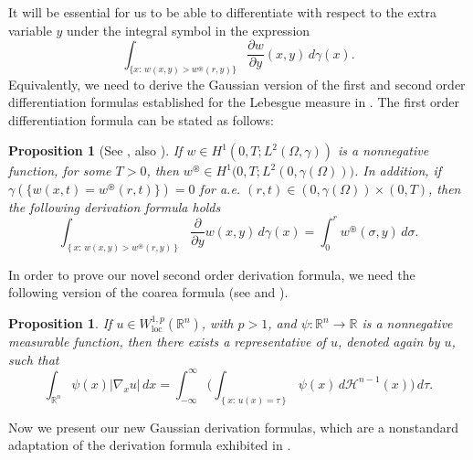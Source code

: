 \documentclass[a4paper,10pt,reqno]{amsart}
\newcommand{\R}{\mathbb{R}}
\newtheorem{proposition}[theorem]{Proposition}
\numberwithin{equation}{section}
\begin{document}
It will be essential for us to be able to differentiate
with respect to the extra variable $y$ under the integral symbol in the expression
\[\int_{\{x:\,w(x,y)>w^{\circledast}(r,y)\}}\frac{\partial w}{\partial y}(x,y)\,d\gamma(x).\]
Equivalently, we need to derive the Gaussian version of the first and second order differentiation
formulas established for the Lebesgue measure in \cite{Al-Li-TRo, Band2, Ferone-Mercaldo, Mossino}. The first order differentiation formula can be stated
as follows:

\begin{proposition}[See \cite{chiacchio}, also \cite{simon}]
If $w\in H^{1}(0,T;L^{2}(\Omega,\gamma))$ is a nonnegative function,
for some $T>0$, then $w^{\circledast}\in H^{1}\big(0,T;L^{2}(0,\gamma(\Omega))\big)$.
In addition, if $\gamma(\{w(x,t)=w^{\circledast}(r,t)\})=0$ for a.e.
$(r,t)\in(0,\gamma(\Omega))\times(0,T)$, then the following derivation formula holds%
\begin{equation}\label{Rakotoson derivation formula}
\int_{\left\{x:\,w(x,y)>w^{\circledast}(r,y)\right\}}
\frac{\partial}{\partial y}w(x,y)\,d\gamma(x)=\int_{0}^{r}
w^{\circledast}(\sigma,y)\,d\sigma.
\end{equation}
\end{proposition}

In order to prove our novel second order derivation formula,
we need the following version of the coarea formula (see \cite{Federer} and \cite[Theorem 11]{Haj}).

\begin{proposition}
\label{Prop coarea copy(1)}If $u\in W_{\mathrm{loc}}^{1,p}(\R^n)$, with $p>1$,
and $\psi:\R^n\to\R$ is a nonnegative measurable function, then there exists a representative of
$u$, denoted again by $u$, such that
\begin{equation}\label{coarea}%
\int_{\R^n}\psi(x)|\nabla_{x}u|\,dx=\int_{-\infty}^{\infty}\bigg(\int_{\left\{x:\,u(x)=\tau\right\}}\psi(x)\,d\mathcal{H}^{n-1}(x)\bigg)\,d\tau.
\end{equation}
\end{proposition}

Now we present our new Gaussian derivation formulas, which are a nonstandard adaptation of the
derivation formula exhibited in \cite{Ferone-Mercaldo}.
\end{document}
